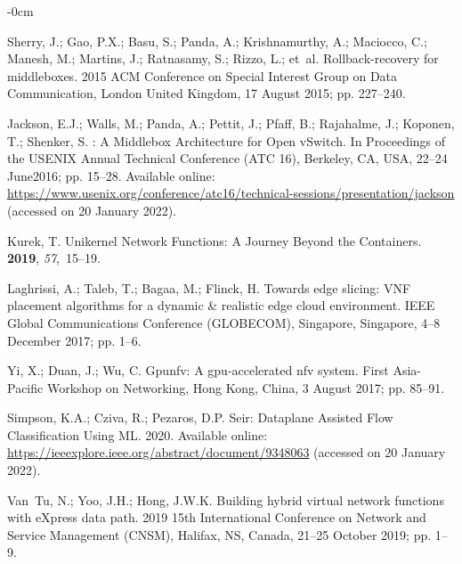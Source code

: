 \documentclass[futureinternet,review,accept,pdftex,moreauthors]{Definitions/mdpi}
\begin{document}
\begin{adjustwidth}{-\extralength}{0cm}
\begin{thebibliography}{999}
Sherry, J.; Gao, P.X.; Basu, S.; Panda, A.; Krishnamurthy, A.; Maciocco, C.;
  Manesh, M.; Martins, J.; Ratnasamy, S.; Rizzo, L.;  et~al.
\newblock Rollback-recovery for middleboxes.
 2015 ACM Conference on Special Interest Group on
  Data Communication,  London United Kingdom, 17 August 2015; pp. 227--240.

Jackson, E.J.; Walls, M.; Panda, A.; Pettit, J.; Pfaff, B.; Rajahalme, J.;
  Koponen, T.; Shenker, S.
: A Middlebox Architecture for {Open vSwitch}.
\newblock  In Proceedings of the {{USENIX} Annual Technical Conference (ATC 16)}, Berkeley, CA, USA, 22--24 June{2016}; pp. 15--28. \newblock  Available online: \url{https://www.usenix.org/conference/atc16/technical-sessions/presentation/jackson}{ (accessed on 20 January 2022).}

Kurek, T.
\newblock Unikernel Network Functions: A Journey Beyond the Containers.
 {\bf 2019}, {\em 57},~15--19.

Laghrissi, A.; Taleb, T.; Bagaa, M.; Flinck, H.
\newblock Towards edge slicing: {VNF} placement algorithms for a dynamic \&
  realistic edge cloud environment.
 IEEE Global Communications Conference (GLOBECOM), Singapore, Singapore,  4--8 December 2017; pp.
  1--6.

Yi, X.; Duan, J.; Wu, C.
\newblock Gpunfv: A gpu-accelerated nfv system.
 First Asia-Pacific Workshop on Networking,  Hong Kong, China, 3 August 2017;
  pp. 85--91.

Simpson, K.A.; Cziva, R.; Pezaros, D.P.
\newblock Sei{\dh}r: Dataplane Assisted Flow Classification Using ML. {2020}. \newblock  Available online: \url{https://ieeexplore.ieee.org/abstract/document/9348063}{ (accessed on 20 January 2022).}%

Van~Tu, N.; Yoo, J.H.; Hong, J.W.K.
\newblock Building hybrid virtual network functions with eXpress data path.
 2019 15th International Conference on Network and Service Management
  (CNSM),  Halifax, NS, Canada, 21--25 October 2019; pp. 1--9.


\end{thebibliography}
\end{adjustwidth}
\end{document}
